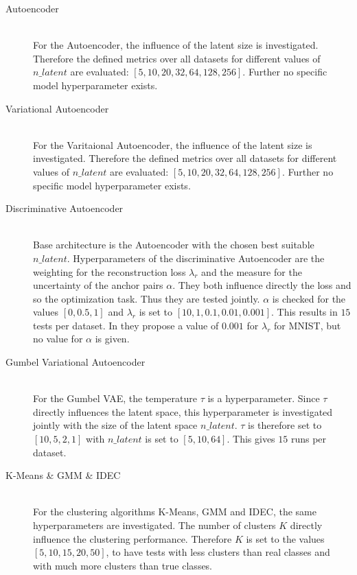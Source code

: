 \documentclass[12pt,DIV14,BCOR12mm,a4paper,footexclude,headinclude,halfparskip-,twoside,openright,cleardoubleempty,idxtotoc,bibtotoc,listtotoc]{scrreprt} %
\numberwithin{equation}{chapter}
\begin{document}
\begin{description}
	\item[Autoencoder]\hfill \\
	For the Autoencoder, the influence of the latent size is investigated. Therefore the defined metrics over all datasets for different values of $n\_latent$ are evaluated: $[5, 10, 20, 32, 64, 128, 256]$. Further no specific model hyperparameter exists.
	\item[Variational Autoencoder]\hfill \\
	For the Varitaional Autoencoder, the influence of the latent size is investigated. Therefore the defined metrics over all datasets for different values of $n\_latent$ are evaluated: $[5, 10, 20, 32, 64, 128, 256]$. Further no specific model hyperparameter exists.
	\item[Discriminative Autoencoder]\hfill \\
	Base architecture is the Autoencoder with the chosen best suitable $n\_latent$. Hyperparameters of the discriminative Autoencoder are the weighting for the reconstruction loss $\lambda_r$ and the measure for the uncertainty of the anchor pairs $\alpha$. They both influence directly the loss and so the optimization task. Thus they are tested jointly. $\alpha$ is checked for the values $[0, 0.5, 1]$ and $\lambda_r$ is set to $[10, 1, 0.1, 0.01, 0.001]$. This results in $15$ tests per dataset. In \cite{DiscriminativeClustering} they propose a value of $0.001$ for $\lambda_r$ for MNIST, but no value for $\alpha$ is given.
	\item[Gumbel Variational Autoencoder]\hfill \\
	For the Gumbel VAE, the temperature $\tau$ is a hyperparameter. Since $\tau$ directly influences the latent space, this hyperparameter is investigated jointly with the size of the latent space $n\_latent$. $\tau$ is therefore set to $[10, 5, 2, 1]$ with $n\_latent$ is set to $[5, 10, 64]$. This gives $15$ runs per dataset.
	\item[K-Means \& GMM \& IDEC]\hfill \\
	For the clustering algorithms K-Means, GMM and IDEC, the same hyperparameters are investigated. The number of clusters $K$ directly influence the clustering performance. Therefore $K$ is set to the values $[5, 10, 15, 20, 50]$, to have tests with less clusters than real classes and with much more clusters than true classes.
\end{description}
\end{document}
